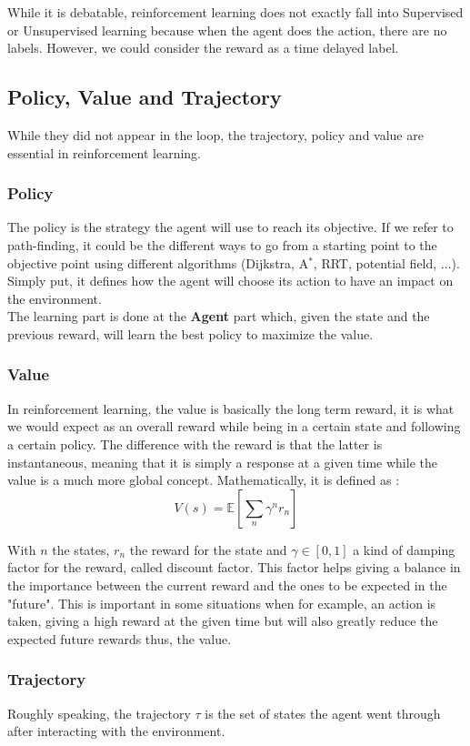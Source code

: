 \documentclass[a4paper,12pt,calibri,oneside,openany]{book}
\theoremstyle{break}
\begin{document}
While it is debatable, reinforcement learning does not exactly fall into Supervised or Unsupervised learning because when the agent does the action, there are no labels. However, we could consider the reward as a time delayed label.
\subsection{Policy, Value and Trajectory}
While they did not appear in the loop, the trajectory, policy and value are essential in reinforcement learning.\\
\subsubsection{Policy}
\qquad The policy is the strategy the agent will use to reach its objective. If we refer to path-finding, it could be the different ways to go from a starting point to the objective point using different algorithms (Dijkstra, A$^*$, RRT, potential field, ...). Simply put, it defines how the agent will choose its action to have an impact on the environment. \\

The learning part is done at the \textbf{Agent} part which, given the state and the previous reward, will learn the best policy to maximize the value.
\subsubsection{Value}
\qquad In reinforcement learning, the value is basically the long term reward, it is what we would expect as an overall reward while being in a certain state and following a certain policy. The difference with the reward is that the latter is instantaneous, meaning that it is simply a response at a given time while the value is a much more global concept. Mathematically, it is defined as :
$$
V(s)=\mathbb{E}\left[\sum_{n}\gamma^n r_n\right]
$$

With $n$ the states, $r_n$ the reward for the state and $\gamma\in[0,1]$ a kind of damping factor for the reward, called discount factor. This factor helps giving a balance in the importance between the current reward and the ones to be expected in the "future". This is important in some situations when for example, an action is taken, giving a high reward at the given time but will also greatly reduce the expected future rewards thus, the value.
\subsubsection{Trajectory}
\qquad Roughly speaking, the trajectory $\tau$ is the set of states the agent went through after interacting with the environment.
\end{document}
